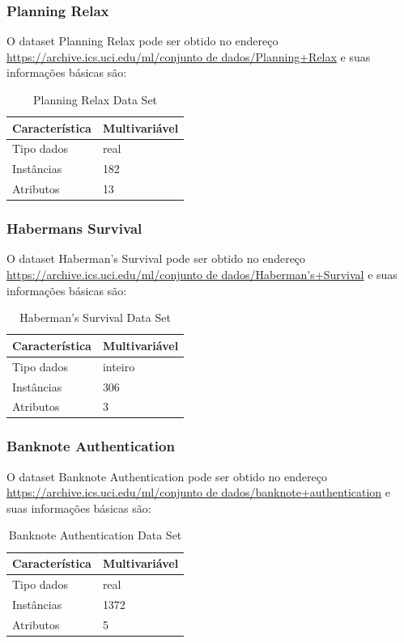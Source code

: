 \documentclass[12pt, a4paper]{article}
\begin{document}
\subsubsection{Planning Relax}
O dataset Planning Relax pode ser obtido no endereço \url{https://archive.ics.uci.edu/ml/conjunto de dados/Planning+Relax} e suas informações básicas são:
\begin{table}[!ht]
\centering
\caption{Planning Relax Data Set}
\label{planningtable}
\begin{tabular}{|l|l|}
\hline
Característica & Multivariável\\
\hline
Tipo dados & real\\
\hline
Instâncias & 182\\
\hline
Atributos & 13\\
\hline
\end{tabular}
\end{table}

\subsubsection{Habermans Survival}
O dataset Haberman's Survival pode ser obtido no endereço \url{https://archive.ics.uci.edu/ml/conjunto de dados/Haberman's+Survival} e suas informações básicas são:
\begin{table}[!ht]
\centering
\caption{Haberman's Survival Data Set}
\label{habermanstable}
\begin{tabular}{|l|l|}
\hline
Característica & Multivariável\\
\hline
Tipo dados & inteiro\\
\hline
Instâncias & 306\\
\hline
Atributos & 3\\
\hline
\end{tabular}
\end{table}

\subsubsection{Banknote Authentication}
O dataset Banknote Authentication pode ser obtido no endereço \url{https://archive.ics.uci.edu/ml/conjunto de dados/banknote+authentication} e suas informações básicas são:
\begin{table}[!ht]
\centering
\caption{Banknote Authentication Data Set}
\label{banknotetable}
\begin{tabular}{|l|l|}
\hline
Característica & Multivariável\\
\hline
Tipo dados & real\\
\hline
Instâncias & 1372\\
\hline
Atributos & 5\\
\hline
\end{tabular}
\end{table}
\end{document}
